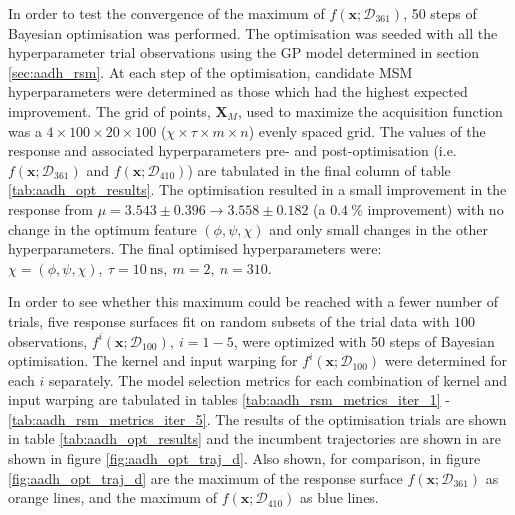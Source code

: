 In order to test the convergence of the maximum of $f\left(\mathbf{x}; \mathcal{D}_{361}\right)$, \num{50} steps of Bayesian optimisation was performed. The optimisation was seeded with all the hyperparameter trial observations using the GP model determined in section \ref{sec:aadh_rsm}. At each step of the optimisation, candidate MSM hyperparameters were determined as those which had the highest expected improvement. The grid of points, $\mathbf{X}_{M}$, used to maximize the acquisition function was a $4 \times 100 \times 20 \times 100$ ($\chi \times \tau \times m \times n$) evenly spaced grid. The values of the response and associated hyperparameters pre- and post-optimisation (i.e. $f\left(\mathbf{x}; \mathcal{D}_{361}\right)$ and $f\left(\mathbf{x}; \mathcal{D}_{410}\right)$) are tabulated in the final column of table \ref{tab:aadh_opt_results}. The optimisation resulted in a small improvement in the response from $\mu=3.543 \pm 0.396 \rightarrow 3.558 \pm 0.182$ (a $\SI{0.4}{\percent}$ improvement) with no change in the optimum feature $(\phi, \psi, \chi)$ and only small changes in the other hyperparameters. The final optimised hyperparameters were: $\chi=(\phi, \psi, \chi),\ \tau=\SI{10}{\nano\second},\ m=2,\ n=310$. 

In order to see whether this maximum could be reached with a fewer number of trials, five response surfaces fit on random subsets of the trial data with $100$ observations, $f^{i}\left(\mathbf{x};\mathcal{D}_{100}\right),\ i = 1 - 5$, were optimized with \num{50} steps of Bayesian optimisation. The kernel and input warping for $f^{i}\left(\mathbf{x};\mathcal{D}_{100}\right)$ were determined for each $i$ separately. The model selection metrics for each combination of kernel and input warping are tabulated in tables \ref{tab:aadh_rsm_metrics_iter_1} - \ref{tab:aadh_rsm_metrics_iter_5}. The results of the optimisation trials are shown in table \ref{tab:aadh_opt_results} and the incumbent trajectories are shown in are shown in figure \ref{fig:aadh_opt_traj_d}. Also shown, for comparison, in figure \ref{fig:aadh_opt_traj_d} are the maximum of the response surface $f\left(\mathbf{x};\mathcal{D}_{361}\right)$ as orange lines, and the maximum of $f\left(\mathbf{x};\mathcal{D}_{410}\right)$ as blue lines. 

